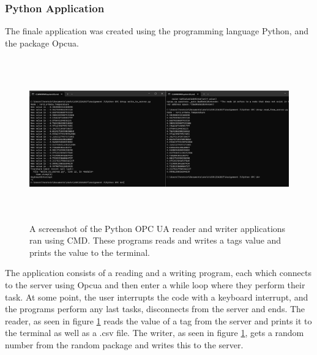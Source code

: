 \documentclass[11pt, A4paper, english]{article}
\begin{document}
			\subsubsection{Python Application}
The finale application was created using the programming language Python, and the package Opcua.
				\begin{figure}[h]
\includegraphics[width=12.8cm, height=7cm]{Python OPC UA/Program_Screenshot.png}
\caption{A screenshot of the Python OPC UA reader and writer applications ran using CMD. These programs reads and writes a tags value and prints the value to the terminal.}
\label{im:P}
				\end{figure}
The application consists of a reading and a writing program, each which connects to the server using Opcua and then enter a while loop where they perform their task. At some point, the user interrupts the code with a keyboard interrupt, and the programs perform any last tasks, disconnects from the server and ends. The reader, as seen in figure \ref{im:P} reads the value of a tag from the server and prints it to the terminal as well as a .csv file. The writer, as seen in figure \ref{im:P}, gets a random number from the random package and writes this to the server.
\end{document}
